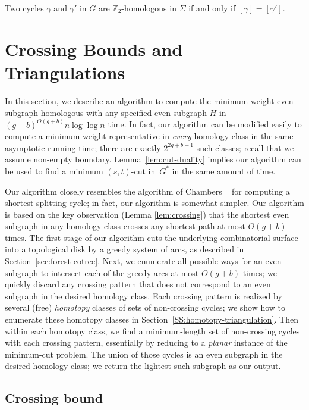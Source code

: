 \documentclass[letterpaper,review]{siamart190516}
\def\Z{\mathbb{Z}}
\def\cycle{\gamma}
\begin{document}
\begin{corollary}
Two cycles $\cycle$ and $\cycle'$ in $G$ are $\Z_2$-homologous in $\Sigma$ if and only if $[\cycle] = [\cycle']$.
\end{corollary}

\section{Crossing Bounds and Triangulations}
\label{sec:crossing}

In this section, we describe an
algorithm to compute the minimum-weight even subgraph homologous with any specified even subgraph 
$H$ in $(g+b)^{O(g+b)}n\log \log n$ time.  In fact, our algorithm can be
modified easily to compute a minimum-weight representative in
\emph{every} homology class in the same asymptotic running time;
there are exactly $2^{2g+b-1}$ such classes; recall that we assume non-empty boundary.
Lemma~\ref{lem:cut-duality} implies our algorithm can be used to find a minimum $(s,t)$-cut in~$G^*$ in the same amount of time.

Our algorithm closely resembles the algorithm of Chambers \etal~\cite{ccelw-scsih-08} for computing a shortest splitting cycle; in fact, our algorithm is somewhat simpler.  Our algorithm is based on the key observation (Lemma \ref{lem:crossing})  that the shortest even subgraph in any homology class crosses any shortest path at most $O(g+b)$ times.  The first stage of our algorithm cuts the underlying combinatorial surface into a topological disk by a greedy system of arcs, as described in Section~\ref{sec:forest-cotree}.  Next, we enumerate all possible ways for an even subgraph to intersect each of the greedy arcs at most $O(g+b)$ times; we quickly discard any crossing pattern that does not correspond to an even subgraph in the desired homology class.  Each crossing pattern is realized by several (free) \emph{homotopy} classes of sets of non-crossing cycles; we show how to enumerate these homotopy classes in Section~\ref{SS:homotopy-triangulation}.  Then within each homotopy class, we find a minimum-length set of non-crossing cycles with each crossing pattern, essentially by reducing to a \emph{planar} instance of the minimum-cut problem.  The union of those cycles is an even subgraph in the desired homology class; we return the lightest such subgraph as our output.


\subsection{Crossing bound}
\label{SS:homotopy-crossing}
\end{document}
